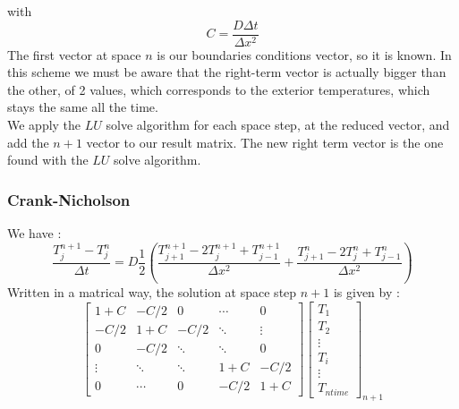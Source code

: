 \documentclass{article}
\begin{document}
                    with $$C = \frac{D\Delta t}{\Delta x ^2}  $$ 
                    The first vector at space $n$ is our boundaries conditions vector, so it is known.
                    In this scheme we must be aware that the right-term vector is actually bigger than
                    the other, of 2 values, which corresponds to the exterior temperatures, which stays
                    the same all the time.\\
                    We apply the $LU$ solve algorithm for each space step, at the reduced vector, and add the $n+1$ vector to our 
                    result matrix. The new right term vector is the one found with the $LU$ solve algorithm.
     
                    \subsubsection{Crank-Nicholson}
                        We have :
                        \begin{equation}
                            \frac{T_{j}^{n+1} - T_{j}^n}{\Delta t} = D\frac{1}{2} (\frac{T_{j+1}^{n+1}- 2T_{j}^{n+1} + T_{j-1}^{n+1}}{\Delta x^2}+\frac{T_{j+1}^{n}- 2T_{j}^{n} + T_{j-1}^{n}}{\Delta x^2})
                        \end{equation}
                        Written in a matrical way, the solution at space step $n+1$ is given by :
                        \begin{equation}
                            \begin{bmatrix}
                                1+C    & -C/2   & 0     & \cdots & 0 \\
                                -C/2   & 1+C    & -C/2   & \ddots & \vdots \\
                                0      & -C/2   & \ddots & \ddots & 0 \\
                                \vdots & \ddots & \ddots & 1+C   & -C/2\\
                                0      & \cdots & 0      & -C/2   & 1+C
                            \end{bmatrix}
                            \begin{bmatrix}
                                T_{1} \\
                                T_{2} \\
                                \vdots \\
                                T_{i} \\
                                \vdots \\
                                T_{ntime}
                            \end{bmatrix}_{n+1}
                            \label{eq:crank}
                        \end{equation}
\end{document}
